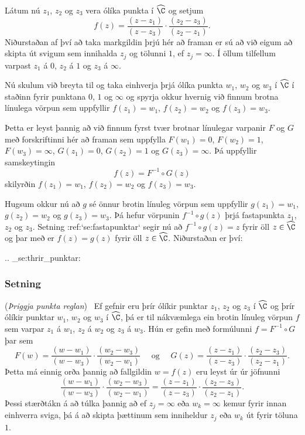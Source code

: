 Látum nú $z_1$, $z_2$ og $z_3$ vera ólíka punkta í $\widehat \C$ og
setjum
$$
f(z)=\dfrac{(z-z_1)}{(z-z_3)}\cdot \dfrac{(z_2-z_3)}{(z_2-z_1)}.
$$
Niðurstaðan af því að taka markgildin þrjú hér að framan er sú að við
eigum að skipta  út svigum sem innihalda $z_j$ og tölunni $1$,
ef $z_j=\infty$.  Í öllum tilfellum varpast $z_1$ á $0$, $z_2$ á 
$1$ og $z_3$ á $\infty$.

Nú skulum við breyta til og taka einhverja þrjá ólíka punkta $w_1$,
$w_2$ og $w_3$ í $\widehat \C$  í staðinn fyrir punktana $0$, $1$ 
og $\infty$ og spyrja okkur hvernig við finnum brotna línulega vörpun
sem uppfyllir $f(z_1)=w_1$, $f(z_2)=w_2$ og $f(z_3)=w_3$.  

Þetta er leyst þannig að við finnum fyrst tvær brotnar línulegar
varpanir $F$ og $G$ með forskriftinni hér að framan sem uppfylla
$F(w_1)=0$, $F(w_2)=1$, $F(w_3)=\infty$, $G(z_1)=0$, $G(z_2)=1$ og 
$G(z_3)=\infty$.  Þá uppfyllir samskeytingin
$$
f(z)=F^{-1}\circ G(z)
$$
skilyrðin $f(z_1)=w_1$, $f(z_2)=w_2$ og $f(z_3)=w_3$.  

Hugsum okkur nú að $g$ sé önnur brotin línuleg vörpun 
sem uppfyllir $g(z_1)=w_1$, $g(z_2)=w_2$ og $g(z_3)=w_3$.
Þá hefur vörpunin $f^{-1}\circ g(z)$ þrjá fastapunkta
$z_1$, $z_2$ og $z_3$.   Setning :ref:`se:fastapunktar` segir nú að 
$f^{-1}\circ g(z)=z$ fyrir öll $z\in \widehat \C$ og þar með
er $f(z)=g(z)$ fyrir öll $z\in \widehat \C$.  Niðurstaðan er því:


.. _se:thrir_punktar:

\subsubsection{Setning} {\rm ({\it Þriggja punkta reglan})} 
\  Ef gefnir eru þrír ólíkir punktar $z_1$, $z_2$ og $z_3$ í $\widehat
\C$ og þrír ólíkir punktar $w_1$, $w_2$ og $w_3$ í $\widehat \C$,
þá er til nákvæmlega ein brotin línuleg vörpun $f$ sem varpar
$z_1$ á $w_1$, $z_2$ á $w_2$ og $z_3$ á $w_3$.  Hún er gefin með
formúlunni $f=F^{-1}\circ G$ þar sem 
$$
F(w)=\dfrac{(w-w_1)}{(w-w_3)}\cdot \dfrac{(w_2-w_3)}{(w_2-w_1)}
\quad \text{ og } \quad 
G(z)=\dfrac{(z-z_1)}{(z-z_3)}\cdot \dfrac{(z_2-z_3)}{(z_2-z_1)}.
$$
Þetta má einnig orða þannig að fallgildin $w=f(z)$ eru leyst úr úr
jöfnunni
$$
\dfrac{(w-w_1)}{(w-w_3)}\cdot \dfrac{(w_2-w_3)}{(w_2-w_1)}
=
\dfrac{(z-z_1)}{(z-z_3)}\cdot \dfrac{(z_2-z_3)}{(z_2-z_1)}.
$$
Þessi stærðtákn á að túlka þannig að ef $z_j=\infty$ eða
$w_k=\infty$ kemur fyrir innan einhverra sviga, þá á að skipta
þættinum sem inniheldur $z_j$ eða $w_k$ út
fyrir töluna $1$.



